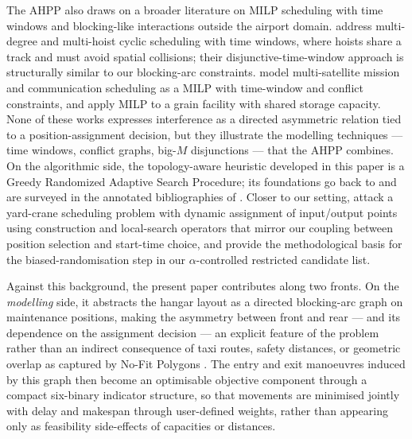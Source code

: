 The AHPP also draws on a broader literature on MILP scheduling with
time windows and blocking-like interactions outside the airport
domain.  \citet{Mao2018} address multi-degree and multi-hoist cyclic
scheduling with time windows, where hoists share a track and must
avoid spatial collisions; their disjunctive-time-window approach is
structurally similar to our blocking-arc constraints.
\citet{Lee2024} model multi-satellite mission and communication
scheduling as a MILP with time-window and conflict constraints, and
\citet{Baya2022} apply MILP to a grain facility with shared storage
capacity.  None of these works expresses interference as a directed
asymmetric relation tied to a position-assignment decision, but they
illustrate the modelling techniques --- time windows, conflict graphs,
big-$M$ disjunctions --- that the AHPP combines.  On the algorithmic
side, the topology-aware heuristic developed in this paper is a Greedy
Randomized Adaptive Search Procedure; its foundations go back to
\citet{Feo1995} and are surveyed in the annotated bibliographies of
\citet{FestaResende2002, FestaResende2009}.  Closer to our setting,
\citet{Wang2024} attack a yard-crane scheduling problem with dynamic
assignment of input/output points using construction and local-search
operators that mirror our coupling between position selection and
start-time choice, and \citet{Ferone2018} provide the methodological
basis for the biased-randomisation step in our $\alpha$-controlled
restricted candidate list.

Against this background, the present paper contributes along two
fronts.  On the \emph{modelling} side, it abstracts the hangar layout
as a directed blocking-arc graph on maintenance positions, making the
asymmetry between front and rear --- and its dependence on the
assignment decision --- an explicit feature of the problem rather than
an indirect consequence of taxi routes, safety distances, or
geometric overlap as captured by No-Fit Polygons
\citep{Qin2018, Qin2018b, Qin2019, Qin2020, Pazhooh2025}.  The entry
and exit manoeuvres induced by this graph then become an optimisable
objective component through a compact six-binary indicator structure,
so that movements are minimised jointly with delay and makespan
through user-defined weights, rather than appearing only as
feasibility side-effects of capacities or distances.

